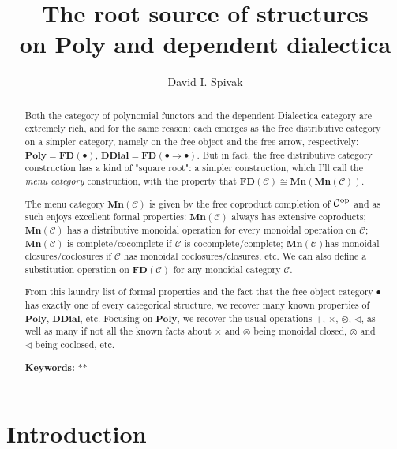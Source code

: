 \documentclass[11pt, one side, article]{memoir}
\theoremstyle{definition}
\theoremstyle{plain}
\newcommand{\cat}[1]{\mathcal{#1}}%
\newcommand{\Cat}[1]{\mathbf{#1}}%
\newcommand{\op}{^\tn{op}}
\newcommand{\tn}[1]{\textnormal{#1}}
\newcommand{\poly}{\Cat{Poly}}
\newcommand{\0}{\textsf{0}}
\newcommand{\1}{\tn{\textsf{1}}}
\newcommand{\2}{\tn{\textsf{2}}}
\newcommand{\3}{\tn{\textsf{3}}}
\newcommand{\4}{\tn{\textsf{4}}}
\newcommand{\5}{\tn{\textsf{5}}}
\newcommand{\6}{\tn{\textsf{6}}}
\newcommand{\7}{\tn{\textsf{7}}}
\newcommand{\8}{\tn{\textsf{8}}}
\newcommand{\9}{\tn{\textsf{9}}}
\newcommand{\tri}{\mathbin{\triangleleft}}
\newcommand{\fd}{\Cat{FD}}
\newcommand{\mn}{\Cat{Mn}}
\newcommand{\ddial}{\Cat{DDial}}
\begin{document}
\title{The root source of structures\\on $\poly$ and dependent dialectica
}

\author{David I. Spivak}

\date{\vspace{-.2in}}

\maketitle

\begin{abstract}
Both the category of polynomial functors and the dependent Dialectica category are extremely rich, and for the same reason: each emerges as the free distributive category on a simpler category, namely on the free object and the free arrow, respectively: $\poly=\fd(\bullet)$, $\ddial=\fd(\bullet\to\bullet)$. But in fact, the free distributive category construction has a kind of "square root": a simpler construction, which I'll call the \emph{menu category} construction, with the property that $\fd(\cat{C})\cong\mn(\mn(\cat{C}))$.

The menu category $\mn(\cat{C})$ is given by the free coproduct completion of $\cat{C}\op$ and as such enjoys excellent formal properties: $\mn(\cat{C})$ always has extensive coproducts; $\mn(\cat{C})$ has a distributive monoidal operation for every monoidal operation on $\cat{C}$; $\mn(\cat{C})$ is complete/cocomplete if $\cat{C}$ is cocomplete/complete; $\mn(\cat{C})$has monoidal closures/coclosures if $\cat{C}$ has monoidal coclosures/closures, etc. We can also define a substitution operation on $\fd(\cat{C})$ for any monoidal category $\cat{C}$. 

From this laundry list of formal properties and the fact that the free object category $\bullet$ has exactly one of every categorical structure, we recover many known properties of $\poly$, $\Cat{DDial}$, etc. Focusing on $\poly$, we recover the usual operations $+$, $\times$, $\otimes$, $\tri$, as well as many if not all the known facts about $\times$ and $\otimes$ being monoidal closed, $\otimes$ and $\tri$ being coclosed, etc.  \\

\smallskip

\noindent
\textbf{Keywords:} **
\end{abstract}

\chapter{Introduction}
\end{document}
